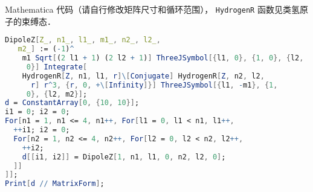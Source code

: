 Mathematica 代码（请自行修改矩阵尺寸和循环范围）， \verb|HydrogenR| 函数见类氢原子的束缚态．
\begin{lstlisting}[language=Mathematica]
DipoleZ[Z_, n1_, l1_, m1_, n2_, l2_, 
   m2_] := (-1)^
    m1 Sqrt[(2 l1 + 1) (2 l2 + 1)] ThreeJSymbol[{l1, 0}, {1, 0}, {l2, 
     0}] Integrate[
    HydrogenR[Z, n1, l1, r]\[Conjugate] HydrogenR[Z, n2, l2, 
      r] r^3, {r, 0, +\[Infinity]}] ThreeJSymbol[{l1, -m1}, {1, 
     0}, {l2, m2}];
d = ConstantArray[0, {10, 10}];
i1 = 0; i2 = 0;
For[n1 = 1, n1 <= 4, n1++, For[l1 = 0, l1 < n1, l1++,
  ++i1; i2 = 0;
  For[n2 = 1, n2 <= 4, n2++, For[l2 = 0, l2 < n2, l2++,
    ++i2;
    d[[i1, i2]] = DipoleZ[1, n1, l1, 0, n2, l2, 0];
  ]]
]];
Print[d // MatrixForm];
\end{lstlisting}
